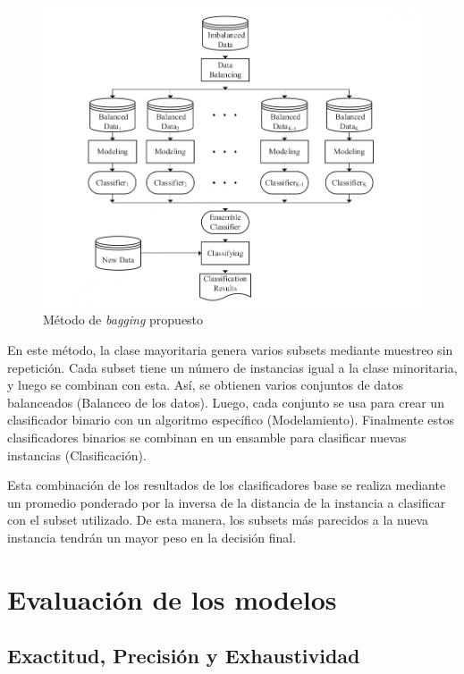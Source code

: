 \begin{figure}[htbp]
	\centering
	\includegraphics[width=\linewidth]{graficos/bagging_imbalanced.png}
	\caption{Método de \textit{bagging} propuesto \citep{sun2015novel}}
	\label{fig:bagging-imbalanced}
\end{figure}

En este método, la clase mayoritaria genera varios subsets mediante muestreo sin repetición. Cada subset tiene un número de instancias igual a la clase minoritaria, y luego se combinan con esta. Así, se obtienen varios conjuntos de datos balanceados (Balanceo de los datos). Luego, cada conjunto se usa para crear un clasificador binario con un algoritmo específico (Modelamiento). Finalmente estos clasificadores binarios se combinan en un ensamble para clasificar nuevas instancias (Clasificación).

Esta combinación de los resultados de los clasificadores base se realiza mediante un promedio ponderado por la inversa de la distancia de la instancia a clasificar con el subset utilizado. De esta manera, los subsets más parecidos a la nueva instancia tendrán un mayor peso en la decisión final.


\section{Evaluación de los modelos}

\subsection{Exactitud, Precisión y Exhaustividad}


